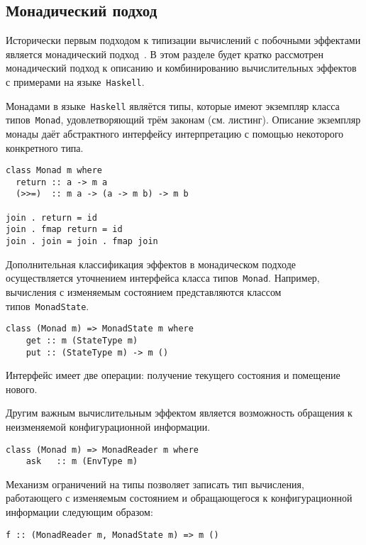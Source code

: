 \documentclass [a4paper] {article}
\begin{document}
\subsection{Монадический подход}

Исторически первым подходом к типизации вычислений с побочными эффектами
является монадический подход~\cite{Moggi:1989:CLM:77350.77353}. В этом разделе
будет кратко рассмотрен монадический подход к описанию и комбинированию
вычислительных эффектов с примерами на языке~\texttt{Haskell}.

Монадами в языке~\texttt{Haskell} являётся типы, которые имеют экземпляр 
класса типов~\texttt{Monad}, удовлетворяющий трём законам
(см. листинг). Описание экземпляр монады даёт абстрактного интерфейсу
интерпретацию с помощью некоторого конкретного типа.   

\begin{verbatim}
class Monad m where
  return :: a -> m a
  (>>=)  :: m a -> (a -> m b) -> m b

join . return = id
join . fmap return = id
join . join = join . fmap join
\end{verbatim}

Дополнительная классификация эффектов в монадическом подходе осуществляется
уточнением интерфейса класса типов~\texttt{Monad}. Например, вычисления с
изменяемым состоянием представляются классом типов~\texttt{MonadState}.

\begin{verbatim}
class (Monad m) => MonadState m where
    get :: m (StateType m)
    put :: (StateType m) -> m ()
\end{verbatim}

Интерфейс имеет две операции: получение текущего состояния и помещение
нового. 

Другим важным вычислительным эффектом является возможность обращения к
неизменяемой конфигурационной информации. 

\begin{verbatim}
class (Monad m) => MonadReader m where
    ask   :: m (EnvType m)
\end{verbatim}

Механизм ограничений на типы позволяет записать тип вычисления, работающего
с изменяемым состоянием и обращающегося к конфигурационной информации следующим
образом:

\begin{verbatim}
f :: (MonadReader m, MonadState m) => m ()
\end{verbatim}   
\end{document}
